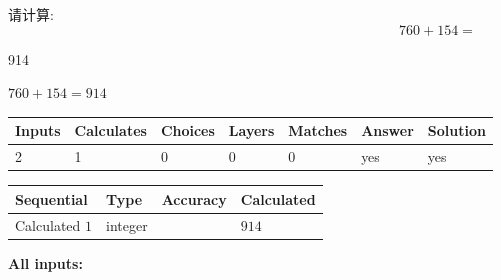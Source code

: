\documentclass{ctexart}
\begin{document}
  
 
请计算:
\begin{equation}
760 +  %
154 = \nonumber
\end{equation}
 
 
 
\noindent{}
 
 

914
 
 
\noindent{}
 
 

 
 
 
\noindent{}
 
 

$ %
760 +  %
154=   %
914$
 
 
\noindent{}
 
 

 
   
   
   
   
\noindent\begin{tabular}{|l|l|l|l|l|l|l|}
 \hline
Inputs & Calculates & Choices & Layers & Matches & Answer & Solution \\ \hline
 2  & 
 1  & 
 0
  & 
 0  & 
 0  & 
  yes & 
  yes 
  \\ \hline
 \end{tabular}
   
   
   
   
\noindent{}
   
   
  
  
\noindent\begin{tabular}{|l|l|l|l|}
\hline
 Sequential & Type & Accuracy & Calculated \\ 
\hline
 
 
  Calculated $  1 $ & integer &  & 
  $ 914 $ 
 \\  \hline  
 \end{tabular}
   
   
   
   
\noindent\vspace{0.1in}\hspace{-0.08in} {\textbf{\Large{All inputs: }}}
   
\end{document}

